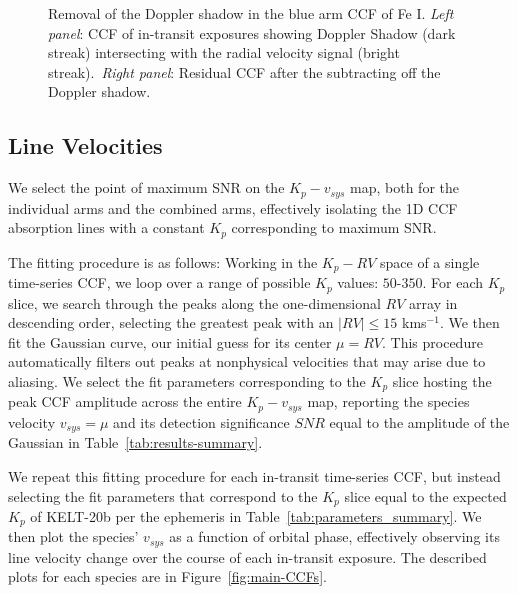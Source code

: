 \documentclass[twocolumn]{aastex631}
\begin{document}
\begin{figure}[ht!]
            \caption{Removal of the Doppler shadow in the blue arm CCF of Fe I. \textit{Left panel}: CCF of in-transit exposures showing Doppler Shadow (dark streak) intersecting with the radial velocity signal (bright streak).~\textit{Right panel}: Residual CCF after the subtracting off the Doppler shadow.}

            \end{figure}
                
        \subsection{Line Velocities}\label{subsec:Line Velocities}
            We select the point of maximum SNR on the ${K_p-v_{sys}}$ map, both for the individual arms and the combined arms, effectively isolating the 1D CCF absorption lines with a constant ${K_p}$ corresponding to maximum SNR.

            The fitting procedure is as follows: Working in the ${K_p-RV}$ space of a single time-series CCF, we loop over a range of possible $K_p$ values: $50$-$350$. For each $K_p$ slice, we search through the peaks along the one-dimensional $RV$ array in descending order, selecting the greatest peak with an $|RV| \leq 15$ kms$^{-1}$. We then fit the Gaussian curve, our initial guess for its center $\mu = RV$. This procedure automatically filters out peaks at nonphysical velocities that may arise due to aliasing.
            We select the fit parameters corresponding to the $K_p$ slice hosting the peak CCF amplitude across the entire $K_p-v_{sys}$ map, reporting the species velocity $v_{sys} = \mu$ and its detection significance $SNR$ equal to the amplitude of the Gaussian in Table~\ref{tab:results-summary}.
            
            We repeat this fitting procedure for each in-transit time-series CCF, but instead selecting the fit parameters that correspond to the $K_p$ slice equal to the expected $K_p$ of KELT-20b per the ephemeris in Table~\ref{tab:parameters_summary}. We then plot the species' $v_{sys}$ as a function of orbital phase, effectively observing its line velocity change over the course of each in-transit exposure. The described plots for each species are in Figure~\ref{fig:main-CCFs}. 
\end{document}
